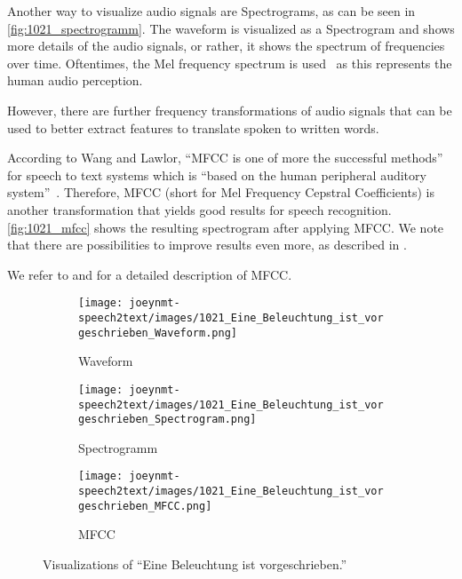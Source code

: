 \documentclass[11pt,a4paper]{article}
\begin{document}
Another way to visualize audio signals are Spectrograms, as can be seen in \autoref{fig:1021_spectrogramm}.
The waveform is visualized as a Spectrogram and shows more details of the audio signals, or rather, it shows the spectrum of frequencies over time.
Oftentimes, the Mel frequency spectrum is used~\cite{MelFreq} as this represents the human audio perception.

However, there are further frequency transformations of audio signals
that can be used to better extract features to translate spoken to written words.

According to Wang and Lawlor, \enquote{MFCC is one of more the successful methods} for speech to text systems which is \enquote{based on the human peripheral auditory system}~\cite{Wang_7983644}.
Therefore, MFCC (short for Mel Frequency Cepstral Coefficients) is another transformation that yields good results for speech recognition.
\autoref{fig:1021_mfcc} shows the resulting spectrogram after applying MFCC.
We note that there are possibilities to improve results even more, as described in \cite{Winursito_8350748}.

We refer to \cite{ittichaichareon2012speech} and \cite{singh2014approach} for a detailed description of MFCC.
 
\begin{figure*}[htb]
    \begin{subfigure}[b]{0.32\textwidth}
        \centering
        \texttt{[image: joeynmt-speech2text/images/1021\_Eine\_Beleuchtung\_ist\_vorgeschrieben\_Waveform.png]}
        \caption{Waveform}
        \label{fig:1021_waveform}
    \end{subfigure}
     \hfill
    \begin{subfigure}[b]{0.32\textwidth}
        \centering
        \texttt{[image: joeynmt-speech2text/images/1021\_Eine\_Beleuchtung\_ist\_vorgeschrieben\_Spectrogram.png]}
        \caption{Spectrogramm}
        \label{fig:1021_spectrogramm}
    \end{subfigure}
     \hfill
    \begin{subfigure}[b]{0.32\textwidth}
        \centering
        \texttt{[image: joeynmt-speech2text/images/1021\_Eine\_Beleuchtung\_ist\_vorgeschrieben\_MFCC.png]}
        \caption{MFCC}
        \label{fig:1021_mfcc}
    \end{subfigure}
    \caption{Visualizations of \enquote{Eine Beleuchtung ist vorgeschrieben.}}
    \label{fig:beleuchtung_viz}
\end{figure*}
\end{document}
